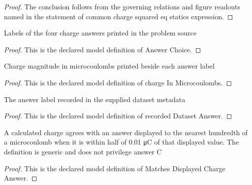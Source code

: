\begin{proof}
  The conclusion follows from the governing relations and figure readouts named in the statement of common charge squared eq statics expression.
\end{proof}
\begin{definition}
  \label{def:physics:phyx-mini-0902:phyxminiproblems-problemphyxmini0902-answerchoice}
  Labels of the four charge answers printed in the problem source
\end{definition}
\begin{proof}
  This is the declared model definition of Answer Choice.
\end{proof}
\begin{definition}
  \label{def:physics:phyx-mini-0902:phyxminiproblems-problemphyxmini0902-answerchoice-chargeinmicrocoulombs}
  Charge magnitude in microcoulombs printed beside each answer label
\end{definition}
\begin{proof}
  This is the declared model definition of charge In Microcoulombs.
\end{proof}
\begin{definition}
  \label{def:physics:phyx-mini-0902:phyxminiproblems-problemphyxmini0902-recordeddatasetanswer}
  The answer label recorded in the supplied dataset metadata
\end{definition}
\begin{proof}
  This is the declared model definition of recorded Dataset Answer.
\end{proof}
\begin{definition}
  \label{def:physics:phyx-mini-0902:phyxminiproblems-problemphyxmini0902-matchesdisplayedchargeanswer}
  A calculated charge agrees with an answer displayed to the nearest hundredth of a microcoulomb when it is within half of 0.01 μC of that displayed value. The definition is generic and does not privilege answer C
\end{definition}
\begin{proof}
  This is the declared model definition of Matches Displayed Charge Answer.
\end{proof}
